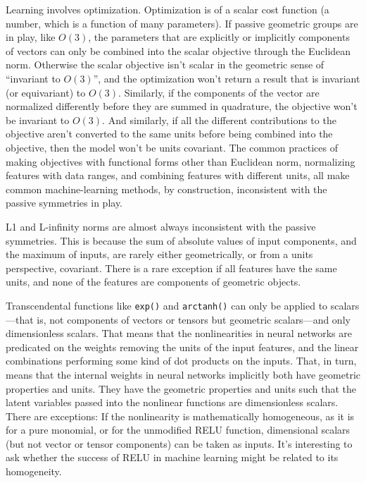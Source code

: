 \documentclass{article}
\theoremstyle{plain}
\theoremstyle{definition}
\theoremstyle{remark}
\begin{document}
Learning involves optimization.
Optimization is of a scalar cost function (a number, which is a function of many parameters).
If passive geometric groups are in play, like $O(3)$, the parameters that are explicitly or implicitly components of vectors can only be combined into the scalar objective through the Euclidean norm.
Otherwise the scalar objective isn't scalar in the geometric sense of ``invariant to $O(3)$'', and the optimization won't return a result that is invariant (or equivariant) to $O(3)$.
Similarly, if the components of the vector are normalized differently before they are summed in quadrature, the objective won't be invariant to $O(3)$.
And similarly, if all the different contributions to the objective aren't converted to the same units before being combined into the objective, then the model won't be units covariant.
The common practices of making objectives with functional forms other than Euclidean norm, normalizing features with data ranges, and combining features with different units, all make common machine-learning methods, by construction, inconsistent with the passive symmetries in play.

L1 and L-infinity norms are almost always inconsistent with the passive symmetries.
This is because the sum of absolute values of input components, and the maximum of inputs, are rarely either geometrically, or from a units perspective, covariant.
There is a rare exception if all features have the same units, and none of the features are components of geometric objects.

Transcendental functions like \texttt{exp()} and \texttt{arctanh()} can only be applied to scalars---that is, not components of vectors or tensors but geometric scalars---and only dimensionless scalars.
That means that the nonlinearities in neural networks are predicated on the weights removing the units of the input features, and the linear combinations performing some kind of dot products on the inputs.
That, in turn, means that the internal weights in neural networks implicitly both have geometric properties and units.
They have the geometric properties and units such that the latent variables passed into the nonlinear functions are dimensionless scalars.
There are exceptions:
If the nonlinearity is mathematically homogeneous, as it is for a pure monomial, or for the unmodified RELU function, dimensional scalars (but not vector or tensor components) can be taken as inputs.
It's interesting to ask whether the success of RELU in machine learning might be related to its homogeneity.
\end{document}
